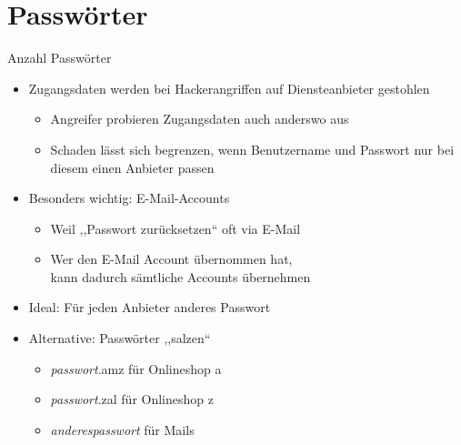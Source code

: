 \section{Passwörter}

\begin{frame}{Anzahl Passwörter}
  \begin{itemize}
    \item Zugangsdaten werden bei Hackerangriffen auf Diensteanbieter gestohlen
    \begin{itemize}
      \item Angreifer probieren Zugangsdaten auch anderswo aus
      \item Schaden lässt sich begrenzen, wenn Benutzername und Passwort nur bei diesem einen Anbieter passen
    \end{itemize}
    \item Besonders wichtig: E-Mail-Accounts
    \begin{itemize}
      \item Weil ,,Passwort zurücksetzen`` oft via E-Mail
      \item Wer den E-Mail Account übernommen hat,\\ kann dadurch sämtliche Accounts übernehmen
    \end{itemize}
    \item Ideal: Für jeden Anbieter anderes Passwort
    \item Alternative: Passwörter ,,salzen``
    \begin{itemize}
      \item \textit{passwort}.amz für Onlineshop a
      \item \textit{passwort}.zal für Onlineshop z
      \item \textit{anderespasswort} für Mails
    \end{itemize}
  \end{itemize}
\end{frame}

